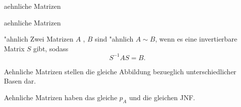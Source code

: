 \documentclass[class=article, crop=false]{standalone}
\begin{document}
\begin{zettel}{aehnliche Matrizen}
\begin{flashcard}{aehnliche Matrizen}
	\begin{definition}{"ahnlich}
		Zwei Matrizen $A$ , $B$ sind "ahnlich $A \sim B$, wenn es eine invertierbare Matrix $S$ gibt, sodass
		\[
			S^{-1} AS = B
		.\]
	\end{definition}
\end{flashcard}

Aehnliche Matrizen stellen die gleiche Abbildung bezueglich unterschiedlicher Basen dar.

Aehnliche Matrizen haben das gleiche $p_{A}$ und die gleichen JNF.
\end{zettel}
\end{document}
